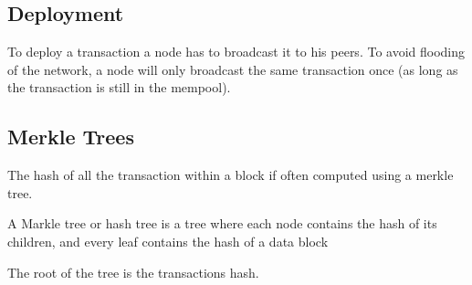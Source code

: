 \documentclass[../documentation.tex]{subfiles}
\begin{document}
\subsection{Deployment}

To deploy a transaction a node has to broadcast it to his peers.
To avoid flooding of the network, a node will only broadcast
the same transaction once (as long as the transaction is still in the mempool).

\subsection{Merkle Trees}

The hash of all the transaction within a block if often
computed using a merkle tree.

A Markle tree or hash tree is a tree where each node contains the hash of its children, and every leaf contains
the hash of a data block

The root of the tree is the transactions hash.

\begin{center}
\end{center}
\end{document}
